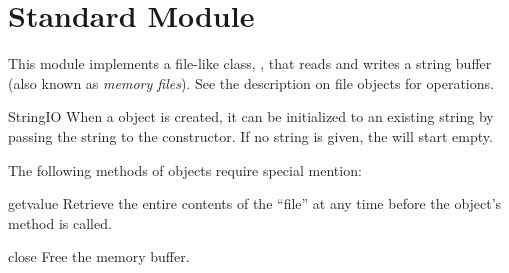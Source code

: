 \section{Standard Module }
\label{module-StringIO}


This module implements a file-like class, ,
that reads and writes a string buffer (also known as \emph{memory
files}). See the description on file objects for operations.

\begin{classdesc}{StringIO}{}
When a  object is created, it can be initialized
to an existing string by passing the string to the constructor.
If no string is given, the  will start empty.
\end{classdesc}

The following methods of  objects require special
mention:

\begin{methoddesc}{getvalue}{}
Retrieve the entire contents of the ``file'' at any time before the
 object's  method is called.
\end{methoddesc}

\begin{methoddesc}{close}{}
Free the memory buffer.
\end{methoddesc}
